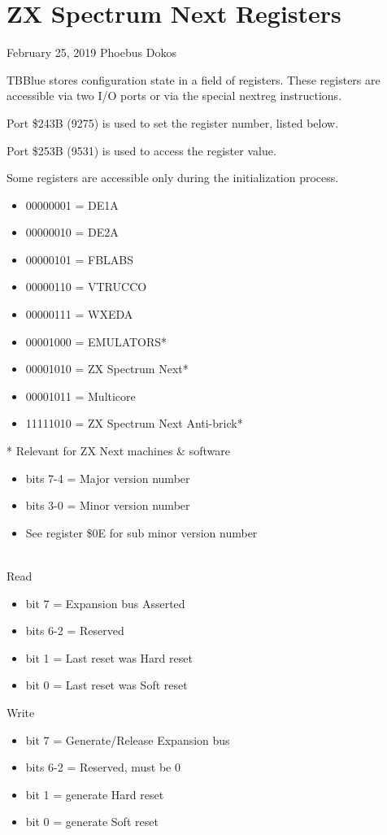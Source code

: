 \section{ZX Spectrum Next Registers}
February 25, 2019  Phoebus Dokos

TBBlue stores configuration state in a field of registers. These
registers are accessible via two I/O ports or via the special nextreg
instructions.

Port \$243B (9275) is used to set the register number, listed below.

Port \$253B (9531) is used to access the register value.

Some registers are accessible only during the initialization process.

\begin{itemize}
\item 00000001 = DE1A
\item 00000010 = DE2A
\item 00000101 = FBLABS
\item 00000110 = VTRUCCO
\item 00000111 = WXEDA
\item 00001000 = EMULATORS*
\item 00001010 = ZX Spectrum Next*
\item 00001011 = Multicore
\item 11111010 = ZX Spectrum Next Anti-brick*
\end{itemize}
* Relevant for ZX Next machines \& software

\begin{itemize}
\item bits 7-4 = Major version number
\item bits 3-0 = Minor version number
\item[] See register \$0E for sub minor version number
\end{itemize}

\\
Read
\begin{itemize}
\item bit 7 = Expansion bus  Asserted
\item bits 6-2 = Reserved
\item bit 1 = Last reset was Hard reset
\item bit 0 = Last reset was Soft reset
\end{itemize}
Write
\begin{itemize}
\item bit 7 = Generate/Release Expansion bus 
\item bits 6-2 = Reserved, must be 0
\item bit 1 = generate Hard reset
\item bit 0 = generate Soft reset
\end{itemize}

